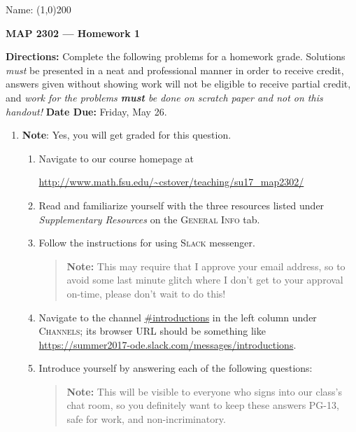\documentclass[12 pt]{article}
\newcommand{\note}[1]{\textbf{Note}: #1}
\begin{document}
\begin{flushright}Name: \line(1,0){200}\end{flushright}
\begin{center}
\Large{\textbf{MAP 2302 --- Homework 1}}
\end{center}
\textbf{Directions:} Complete the following problems for a homework grade. Solutions \textit{must} be presented in a neat and professional manner in order to receive credit, answers given without showing work will not be eligible to receive partial credit, and \textit{work for the problems \textbf{must} be done on scratch paper and not on this handout!} \textbf{Date Due:} Friday, May 26.
\vspace{0.125in}
\begin{enumerate}[leftmargin=0in, rightmargin=-0.25in]
	\item \note{Yes, you will get graded for this question. \smiley}
	\begin{enumerate}[itemsep=0.25in]
		\item Navigate to our course homepage at
		\begin{center} \url{http://www.math.fsu.edu/~cstover/teaching/su17_map2302/}
		\end{center}
		\item Read and familiarize yourself with the three resources listed under \textit{Supplementary Resources} on the \textsc{General Info} tab.
		\item Follow the instructions for using \textsc{Slack} messenger.\begin{quote}\textbf{Note:} This may require that I approve your email address, so to avoid some last minute glitch where I don't get to your approval on-time, please don't wait to do this!\end{quote}
		\item Navigate to the channel \url{#introductions} in the left column under \textsc{Channels}; its browser URL should be something like \url{https://summer2017-ode.slack.com/messages/introductions}.
		\item Introduce yourself by answering each of the following questions:
		\begin{quote}\textbf{Note:} This will be visible to everyone who signs into our class's chat room, so you definitely want to keep these answers PG-13, safe for work, and non-incriminatory. {\Large\smiley}\end{quote}
		\begin{enumerate}[label=(\roman*),itemsep=3mm]

\end{enumerate}
\end{enumerate}
\end{enumerate}
\end{document}
